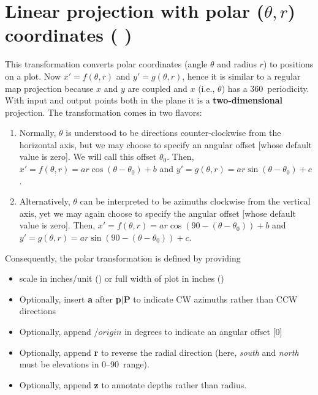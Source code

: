 

\section{Linear projection with polar ($\theta, r$) coordinates ( )}


This transformation converts polar coordinates (angle $\theta$ and radius $r$)
to positions on a plot.  Now $x' = f(\theta,r)$ and $y' = g(\theta,r)$, hence it is similar
to a regular map projection because $x$ and $y$ are coupled and $x$ (i.e., $\theta$) has a 360\DS\ periodicity.
With input and output points both in the plane it is a \textbf{two-dimensional} projection.
The transformation comes in two flavors:

\begin{enumerate}
\item Normally, $\theta$ is understood to be directions counter-clockwise from the horizontal axis, but we may choose
to specify an angular offset [whose default value is zero].  We will call this offset $\theta_0$.
Then, $x' = f(\theta, r) = ar \cos (\theta-\theta_0) + b$ and $y' = g(\theta, r) = ar \sin (\theta-\theta_0) + c$.
\item Alternatively, $\theta$ can be interpreted to be azimuths clockwise from the vertical axis, yet we may again
choose to specify the angular offset [whose default value is zero].
Then, $x' = f(\theta, r) = ar \cos (90 - (\theta-\theta_0)) + b$ and $y' = g(\theta, r) = ar \sin (90 - (\theta-\theta_0)) + c$.
\end{enumerate}

Consequently, the polar transformation is defined by providing

\begin{itemize}
\item scale in inches/unit () or full width of plot in inches ()
\item Optionally, insert \textbf{a} after \textbf{p$|$P} to indicate CW azimuths rather than CCW directions
\item Optionally, append /$origin$ in degrees to indicate an angular offset [0]
\item Optionally, append \textbf{r} to reverse the radial direction (here, \emph{south} and \emph{north} must be elevations in 0--90\DS\ range).
\item Optionally, append \textbf{z} to annotate depths rather than radius.
\end{itemize}

